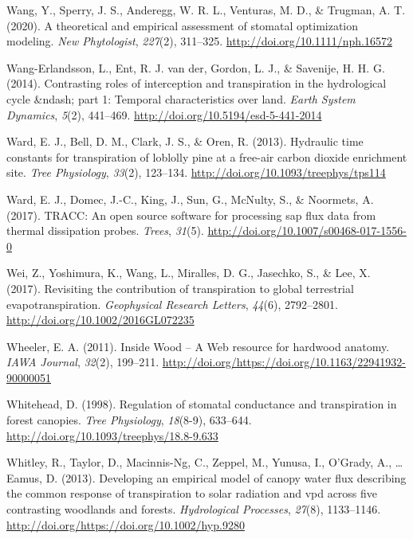 \documentclass[11pt,twoside]{reedthesis}
\begin{document}
\hypertarget{ref-Wang2020}{}
Wang, Y., Sperry, J. S., Anderegg, W. R. L., Venturas, M. D., \&
Trugman, A. T. (2020). A theoretical and empirical assessment of
stomatal optimization modeling. \emph{New Phytologist}, \emph{227}(2),
311--325. \url{http://doi.org/10.1111/nph.16572}

\hypertarget{ref-Wang-Erlandsson2014}{}
Wang-Erlandsson, L., Ent, R. J. van der, Gordon, L. J., \& Savenije, H.
H. G. (2014). Contrasting roles of interception and transpiration in the
hydrological cycle \&ndash; part 1: Temporal characteristics over land.
\emph{Earth System Dynamics}, \emph{5}(2), 441--469.
\url{http://doi.org/10.5194/esd-5-441-2014}

\hypertarget{ref-Ward2013}{}
Ward, E. J., Bell, D. M., Clark, J. S., \& Oren, R. (2013). Hydraulic
time constants for transpiration of loblolly pine at a free-air carbon
dioxide enrichment site. \emph{Tree Physiology}, \emph{33}(2), 123--134.
\url{http://doi.org/10.1093/treephys/tps114}

\hypertarget{ref-Ward2017}{}
Ward, E. J., Domec, J.-C., King, J., Sun, G., McNulty, S., \& Noormets,
A. (2017). TRACC: An open source software for processing sap flux data
from thermal dissipation probes. \emph{Trees}, \emph{31}(5).
\url{http://doi.org/10.1007/s00468-017-1556-0}

\hypertarget{ref-Wei2017}{}
Wei, Z., Yoshimura, K., Wang, L., Miralles, D. G., Jasechko, S., \& Lee,
X. (2017). Revisiting the contribution of transpiration to global
terrestrial evapotranspiration. \emph{Geophysical Research Letters},
\emph{44}(6), 2792--2801. \url{http://doi.org/10.1002/2016GL072235}

\hypertarget{ref-insidewood}{}
Wheeler, E. A. (2011). Inside Wood -- A Web resource for hardwood
anatomy. \emph{IAWA Journal}, \emph{32}(2), 199--211.
\url{http://doi.org/https://doi.org/10.1163/22941932-90000051}

\hypertarget{ref-Whitehead1998}{}
Whitehead, D. (1998). Regulation of stomatal conductance and
transpiration in forest canopies. \emph{Tree Physiology},
\emph{18}(8-9), 633--644.
\url{http://doi.org/10.1093/treephys/18.8-9.633}

\hypertarget{ref-Whitley2013}{}
Whitley, R., Taylor, D., Macinnis-Ng, C., Zeppel, M., Yunusa, I.,
O'Grady, A., \ldots{} Eamus, D. (2013). Developing an empirical model of
canopy water flux describing the common response of transpiration to
solar radiation and vpd across five contrasting woodlands and forests.
\emph{Hydrological Processes}, \emph{27}(8), 1133--1146.
\url{http://doi.org/https://doi.org/10.1002/hyp.9280}
\end{document}
